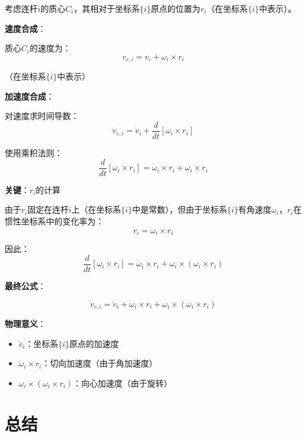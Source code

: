\documentclass[12pt,a4paper]{article}
\begin{document}
考虑连杆$i$的质心$C_i$，其相对于坐标系$\{i\}$原点的位置为$r_i$（在坐标系$\{i\}$中表示）。

\textbf{速度合成}：

质心$C_i$的速度为：
\begin{equation}
v_{c,i} = v_i + \omega_i \times r_i
\end{equation}

（在坐标系$\{i\}$中表示）

\textbf{加速度合成}：

对速度求时间导数：
\begin{equation}
\dot{v}_{c,i} = \dot{v}_i + \frac{d}{dt}[\omega_i \times r_i]
\end{equation}

使用乘积法则：
\begin{equation}
\frac{d}{dt}[\omega_i \times r_i] = \dot{\omega}_i \times r_i + \omega_i \times \dot{r}_i
\end{equation}

\textbf{关键}：$\dot{r}_i$的计算

由于$r_i$固定在连杆$i$上（在坐标系$\{i\}$中是常数），但由于坐标系$\{i\}$有角速度$\omega_i$，$r_i$在惯性坐标系中的变化率为：
\begin{equation}
\dot{r}_i = \omega_i \times r_i
\end{equation}

因此：
\begin{equation}
\frac{d}{dt}[\omega_i \times r_i] = \dot{\omega}_i \times r_i + \omega_i \times (\omega_i \times r_i)
\end{equation}

\textbf{最终公式}：

\begin{equation}
\dot{v}_{c,i} = \dot{v}_i + \dot{\omega}_i \times r_i + \omega_i \times (\omega_i \times r_i) \tag{23}
\end{equation}

\textbf{物理意义}：
\begin{itemize}
\item $\dot{v}_i$：坐标系$\{i\}$原点的加速度
\item $\dot{\omega}_i \times r_i$：切向加速度（由于角加速度）
\item $\omega_i \times (\omega_i \times r_i)$：向心加速度（由于旋转）
\end{itemize}

\section{总结}
\end{document}
